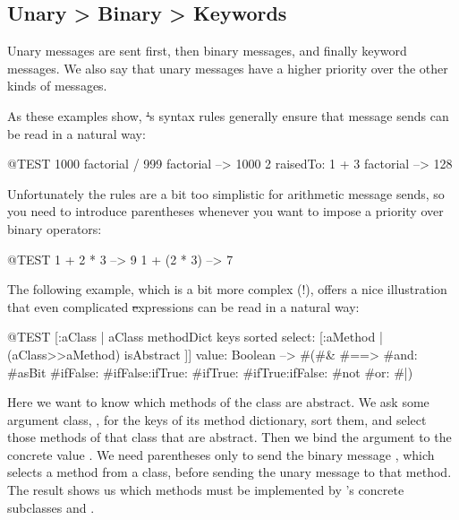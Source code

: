 \documentclass[a4paper,10pt,twoside]{book}
\begin{document}
\subsection*{Unary > Binary > Keywords}
Unary messages are sent first, then binary messages, and finally keyword messages. We also say that unary messages have a higher  priority over the other kinds of messages.


As these examples show, \st's syntax rules generally ensure that message sends can be read in a natural way:
\begin{code}{@TEST}
1000 factorial / 999 factorial --> 1000
2 raisedTo: 1 + 3 factorial     --> 128
\end{code}
\noindent

Unfortunately the rules are a bit too simplistic for arithmetic message sends, so you need to introduce parentheses whenever you want to impose a priority over binary operators:
\begin{code}{@TEST}
1 + 2 * 3   --> 9
1 + (2 * 3) --> 7
\end{code}

The following example, which is a bit more complex (!), offers a nice illustration that even complicated \st expressions can be read in a natural way:
\begin{code}{@TEST}
[:aClass | aClass methodDict keys sorted select: [:aMethod | (aClass>>aMethod) isAbstract ]] value: Boolean 
--> #(#& #==> #and: #asBit #ifFalse: #ifFalse:ifTrue: #ifTrue: #ifTrue:ifFalse: #not #or: #|)
\end{code}
\noindent
Here we want to know which methods of the  class are abstract.
We ask some argument class, , for the keys of its method dictionary, sort them, and select those methods of that class that are abstract.
Then we bind the argument  to the concrete value .
We need parentheses only to send the binary message \ct{>>}, which selects a method from a class, before sending the unary message \mbox{} to that method. The result shows us which methods must be implemented by 's concrete subclasses  and .

\end{document}
